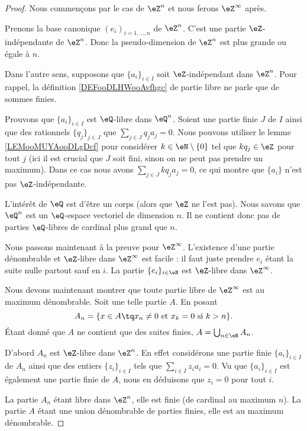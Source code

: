\begin{proof}
	Nous commençons par le cas de \( \eZ^n\) et nous ferons \( \eZ^{\infty}\) après.
	\begin{subproof}
		\spitem[\( \geq n\)]
		Prenons la base canonique \( (e_i)_{i=1,\ldots,n}\) de \( \eZ^n\). C'est une partie \( \eZ\)-indépendante de \( \eZ^n\). Donc la pseudo-dimension de \( \eZ^n\) est plus grande ou égale à \( n\).

		\spitem[\( \leq n\)]
		Dans l'autre sens, supposons que \( \{ a_i \}_{i\in I}\) soit \( \eZ\)-indépendant dans \( \eZ^n\). Pour rappel, la définition \ref{DEFooDLHWooAvfhgc} de partie libre ne parle que de sommes finies.

		Prouvons que \( \{ a_i \}_{i\in I} \) est \( \eQ\)-libre dans \( \eQ^n\). Soient une partie finie \( J\) de \( I\) ainsi que des rationnels \( \{ q_j \}_{j\in J}\) que \( \sum_{j\in J}q_ja_j=0\). Nous pouvons utiliser le lemme \ref{LEMooMUYAooDLgDcf} pour considérer \( k\in \eN\setminus\{ 0 \}\) tel que \( kq_j\in \eZ\) pour tout \( j\) (ici il est crucial que \( J\) soit fini, sinon on ne peut pas prendre un maximum). Dans ce cas nous avons \( \sum_{j\in J}kq_ja_j=0\), ce qui montre que \( \{ a_i \}\) n'est pas \( \eZ\)-indépendante.

		L'intérêt de \( \eQ\) est d'être un corps (alors que \( \eZ\) ne l'est pas). Nous savons que \( \eQ^n\) est un \( \eQ\)-espace vectoriel de dimension \( n\). Il ne contient donc pas de parties \( \eQ\)-libres de cardinal plus grand que \( n\).
	\end{subproof}

	Nous passons maintenant à la preuve pour \( \eZ^{\infty}\)\cite{MonCerveau}. L'existence d'une partie dénombrable et \( \eZ\)-libre dans \( \eZ^{\infty}\) est facile : il faut juste prendre \( e_i\) étant la suite nulle partout sauf en \( i\). La partie \( \{ e_i \}_{i\in \eN}\) est \( \eZ\)-libre dans \( \eZ^{\infty}\).

	Nous devons maintenant montrer que toute partie libre de \( \eZ^{\infty}\) est au maximum dénombrable. Soit une telle partie \( A\). En posant
	\begin{equation}
		A_n=\{ x\in A\tq x_n\neq 0\text{ et }x_k=0\text{ si }k>n \}.
	\end{equation}
	Étant donné que \( A\) ne contient que des suites finies, \( A=\bigcup_{n\in \eN}A_n\).

	D'abord \( A_n\) est \( \eZ\)-libre dans \( \eZ^n\). En effet considérons une partie finie \( \{ a_i \}_{i\in I}\) de \( A_n\) ainsi que des entiers \( \{ z_i \}_{i\in I}\) tels que \( \sum_{i\in I}z_ia_i=0\). Vu que \( \{ a_i \}_{i\in I}\) est également une partie finie de \( A\), nous en déduisons que \( z_i=0\) pour tout \( i\).

	La partie \( A_n\) étant libre dans \( \eZ^n\), elle est finie (de cardinal au maximum \( n\)). La partie \( A\) étant une union dénombrable de parties finies, elle est au maximum dénombrable.
\end{proof}

